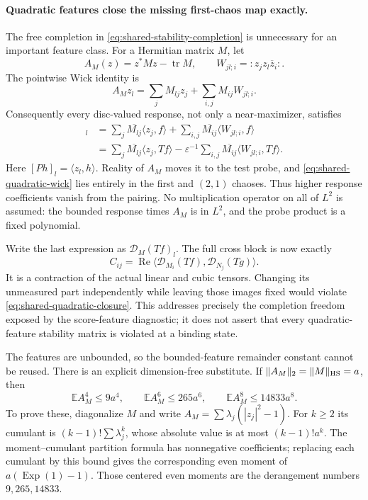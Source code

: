\paragraph{Quadratic features close the missing first-chaos map exactly.}
The free completion in \eqref{eq:shared-stability-completion} is unnecessary
for an important feature class. For a Hermitian matrix $M$, let
\[
 A_M(z)=z^*Mz-\operatorname{tr}M,\qquad
 W_{jl;i}={:}z_jz_l\overline z_i{:}.
\]
The pointwise Wick identity is
\begin{equation}\label{eq:shared-quadratic-wick}
 A_Mz_l=\sum_jM_{lj}z_j+\sum_{i,j}M_{ij}W_{jl;i}.
\end{equation}
Consequently every disc-valued response, not only a near-maximizer, satisfies
\begin{align}
 [P(fA_M)]_l
 &=\sum_j\overline{M_{lj}}\langle z_j,f\rangle
       +\sum_{i,j}\overline{M_{ij}}\langle W_{jl;i},f\rangle
       \nonumber\\
 &=\sum_j\overline{M_{lj}}\langle z_j,Tf\rangle
       -\varepsilon^{-1}\sum_{i,j}\overline{M_{ij}}
                                      \langle W_{jl;i},Tf\rangle.
       \label{eq:shared-quadratic-closure}
\end{align}
Here $[Ph]_l=\langle z_l,h\rangle$. Reality of $A_M$ moves it to the test
probe, and \eqref{eq:shared-quadratic-wick} lies entirely in the first and
$(2,1)$ chaoses. Thus higher response coefficients vanish from the pairing.
No multiplication operator on all of $L^2$ is assumed: the bounded response
times $A_M$ is in $L^2$, and the probe product is a fixed polynomial.

Write the last expression as $\mathcal D_M(Tf)_l$. The full cross block is
now exactly
\[
 C_{ij}=\operatorname{Re}\langle\mathcal D_{M_i}(Tf),
                                      \mathcal D_{N_j}(Tg)\rangle.
\]
It is a contraction of the actual linear and cubic tensors. Changing its
unmeasured part independently while leaving those images fixed would violate
\eqref{eq:shared-quadratic-closure}. This addresses precisely the completion
freedom exposed by the score-feature diagnostic; it does not assert that
every quadratic-feature stability matrix is violated at a binding state.

The features are unbounded, so the bounded-feature remainder constant cannot
be reused. There is an explicit dimension-free substitute. If
$\|A_M\|_2=\|M\|_{\rm HS}=a$, then
\[
 \mathbb EA_M^4\le9a^4,\qquad
 \mathbb EA_M^6\le265a^6,\qquad
 \mathbb EA_M^8\le14833a^8.
\]
To prove these, diagonalize $M$ and write
$A_M=\sum\lambda_j(|z_j|^2-1)$. For $k\ge2$ its cumulant is
$(k-1)!\sum\lambda_j^k$, whose absolute value is at most $(k-1)!a^k$.
The moment--cumulant partition formula has nonnegative coefficients; replacing
each cumulant by this bound gives the corresponding even moment of
$a(\operatorname{Exp}(1)-1)$. Those centered even moments are the derangement
numbers $9,265,14833$.


